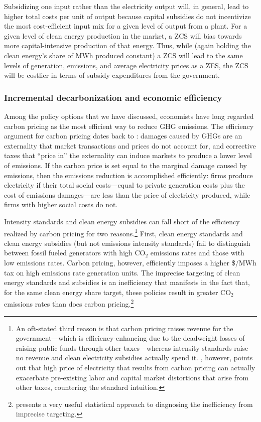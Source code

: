 \documentclass[12pt]{article}
\begin{document}
Subsidizing one input rather than the electricity output will, in general, lead to higher total costs per unit of output because capital subsidies do not incentivize the most cost-efficient input mix for a given level of output from a plant.  For a given level of clean energy production in the market, a ZCS will bias towards more capital-intensive  production of that energy. Thus, while (again holding the clean energy's share of MWh produced constant) a ZCS will lead to the same levels of generation, emissions, and average electricity prices as a ZES, the ZCS will be costlier in terms of subsidy expenditures from the government.



\subsubsection{Incremental decarbonization and economic efficiency}

Among the policy options that we have discussed, economists have long regarded carbon pricing as the most efficient way to reduce GHG emissions. The efficiency argument for carbon pricing dates back to \cite{pigou20}: damages caused by GHGs are an externality that market transactions and prices do not account for, and corrective taxes that ``price in'' the externality can induce markets to produce a lower level of emissions. If the carbon price is set equal to the marginal damage caused by emissions, then the emissions reduction is accomplished efficiently: firms produce electricity if their total social costs---equal to private generation costs plus the cost of emissions damages---are less than the price of electricity produced, while firms with higher social costs do not.

Intensity standards and clean energy subsidies can fall short of the efficiency realized by carbon pricing for two reasons.\footnote{An oft-stated third reason is that carbon pricing raises revenue for the government---which is efficiency-enhancing due to the deadweight losses of raising public funds through other taxes---whereas intensity standards raise no revenue and clean electricity subsidies actually spend it. \cite{goulder2016general}, however, points out that high price of electricity that results from carbon pricing can actually exacerbate pre-existing labor and capital market distortions that arise from other taxes, countering the standard intuition.} First, clean energy standards and clean energy subsidies (but not emissions intensity standards) fail to distinguish between fossil fueled generators with high CO$_2$ emissions rates and those with low emissions rates. Carbon pricing, however, efficiently imposes a higher \$/MWh tax on high emissions rate generation units. The imprecise targeting of clean energy standards and subsidies is an inefficiency that manifests in the fact that, for the same clean energy share target, these policies result in greater CO$_2$ emissions rates than does carbon pricing.\footnote{\cite{jacobsen2020use} presents a very useful statistical approach to diagnosing the inefficiency from imprecise targeting.}
\end{document}
